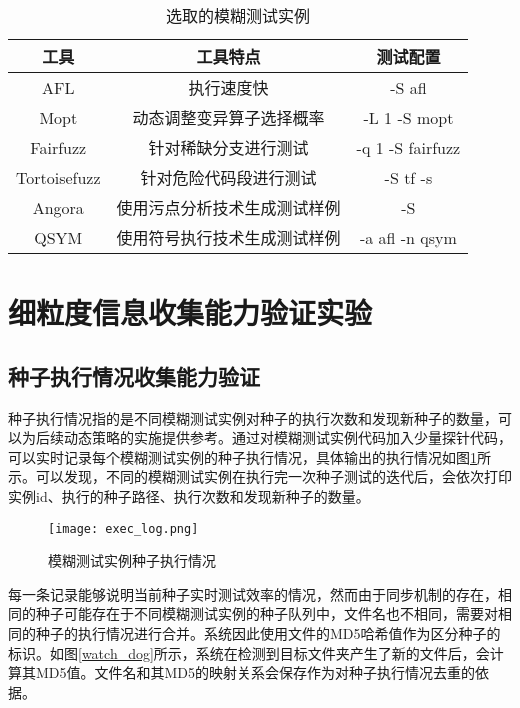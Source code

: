 \documentclass[master]{thesis-uestc}
\begin{document}
\begin{table}[!htbp]
    \caption{选取的模糊测试实例}
    \begin{tabular}{ccc}
    \toprule
    工具 & 工具特点 & 测试配置 \\
    \midrule
    AFL & 执行速度快 & -S afl \\
    Mopt & 动态调整变异算子选择概率 & -L 1 -S mopt \\
    Fairfuzz & 针对稀缺分支进行测试 & -q 1 -S fairfuzz \\
    Tortoisefuzz & 针对危险代码段进行测试 & -S tf -s \\
    Angora & 使用污点分析技术生成测试样例 & -S \\
    QSYM & 使用符号执行技术生成测试样例 & -a afl -n qsym \\
    \bottomrule
    \end{tabular}
    \label{table_instances}
    \vspace{6pt}
\end{table}

\section{细粒度信息收集能力验证实验}

\subsection{种子执行情况收集能力验证}

种子执行情况指的是不同模糊测试实例对种子的执行次数和发现新种子的数量，可以为后续动态策略的实施提供参考。通过对模糊测试实例代码加入少量探针代码，可以实时记录每个模糊测试实例的种子执行情况，具体输出的执行情况如图\ref{exec_log}所示。可以发现，不同的模糊测试实例在执行完一次种子测试的迭代后，会依次打印实例id、执行的种子路径、执行次数和发现新种子的数量。

\begin{figure}[!htbp]
    \vspace{6pt}
    \centering
    \texttt{[image: exec\_log.png]}
    \caption{模糊测试实例种子执行情况}
    \label{exec_log}
\end{figure}

每一条记录能够说明当前种子实时测试效率的情况，然而由于同步机制的存在，相同的种子可能存在于不同模糊测试实例的种子队列中，文件名也不相同，需要对相同的种子的执行情况进行合并。系统因此使用文件的MD5哈希值作为区分种子的标识。如图\ref{watch_dog}所示，系统在检测到目标文件夹产生了新的文件后，会计算其MD5值。文件名和其MD5的映射关系会保存作为对种子执行情况去重的依据。
\end{document}

